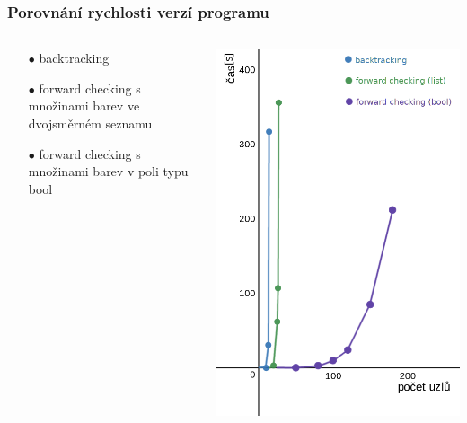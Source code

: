 \documentclass[10pt,xcolor=pdflatex]{beamer}
\begin{document}
\begin{frame}\frametitle{Porovnání rychlosti verzí programu}

    \begin{columns}
    \begin{column}{0.5\textwidth}
        \begin{itemize}
        \item[$\bullet$] backtracking
        \item[$\bullet$] forward checking s množinami barev ve dvojsměrném seznamu 
        \item[$\bullet$] forward checking s množinami barev v poli typu bool
        \end{itemize}
    \end{column}
    \begin{column}{0.5\textwidth}
        \begin{center}
         \includegraphics[scale=0.25]{img/compare_alg.png}
         \end{center}
    \end{column}
    \end{columns}
\end{frame}
\end{document}
